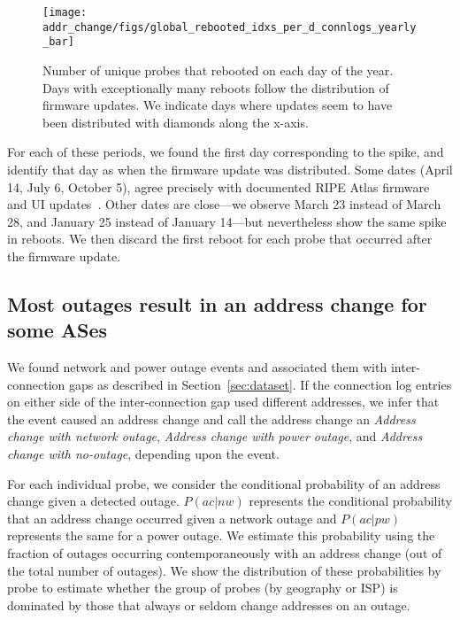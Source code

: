 \begin{figure*}[tb]
  \begin{center}
    \texttt{[image: addr\_change/figs/global\_rebooted\_idxs\_per\_d\_connlogs\_yearly\_bar]}
  \end{center}
  \caption{\label{fig:global_rebooted_idxs_per_d} Number of unique
    probes that rebooted on each day of the year.  Days with exceptionally
    many reboots follow the distribution of firmware updates.  We indicate
    days where updates seem to have been distributed with 
    diamonds along the x-axis.}
\end{figure*}
For each of these periods, we found the first day
corresponding to the spike, and identify that day as when
the firmware update was distributed.  Some dates (April 14,
July 6, October 5), agree precisely with documented
RIPE Atlas firmware and UI
updates~\cite{atlas-firmware-updates}. Other dates are close---we
observe March 23 instead of March 28, and January 25 instead
of January 14---but nevertheless show the same spike in reboots.
We then discard the first reboot for each probe that occurred
after the firmware update.

\subsection{Most outages result in an address change for some ASes}

We found network and power outage events and associated them with inter-connection gaps as
described in Section~\ref{sec:dataset}. If the connection log entries
on either side of the inter-connection gap used different
addresses, we infer that the event caused an address change and call
the address change an \emph{Address change with network outage},
\emph{Address change with power outage}, and \emph{Address change with
no-outage}, depending upon the event.

For each individual probe, we consider the conditional
probability of an address change given a detected
outage. $P(ac|nw)$
represents the conditional probability that an address change occurred
given a network outage and $P(ac|pw)$ represents the same for a power outage.
We estimate this probability using the
fraction of outages occurring contemporaneously with an address change (out of the
total number of outages).  We show the distribution of
these probabilities by probe to estimate whether the group
of probes (by geography or ISP) is dominated by those that
always or seldom change addresses on an outage.

